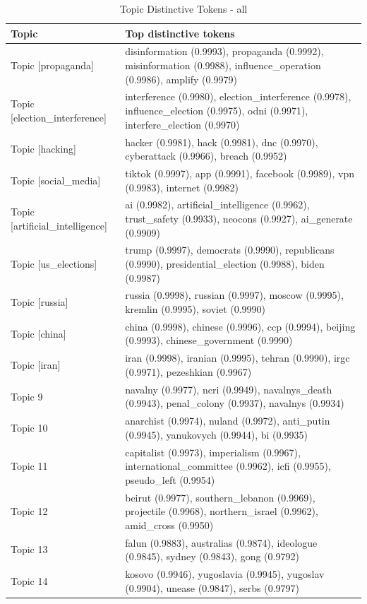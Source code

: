 \begin{table}
\centering
\small
\caption{Topic Distinctive Tokens - all}
\label{tab:topic_distinctive_tokens_all}
\begin{tabular}{lp{12cm}}
\toprule
Topic & Top distinctive tokens \\
\midrule
Topic [propaganda] & disinformation (0.9993), propaganda (0.9992), misinformation (0.9988), influence\_operation (0.9986), amplify (0.9979) \\
Topic [election\_interference] & interference (0.9980), election\_interference (0.9978), influence\_election (0.9975), odni (0.9971), interfere\_election (0.9970) \\
Topic [hacking] & hacker (0.9981), hack (0.9981), dnc (0.9970), cyberattack (0.9966), breach (0.9952) \\
Topic [social\_media] & tiktok (0.9997), app (0.9991), facebook (0.9989), vpn (0.9983), internet (0.9982) \\
Topic [artificial\_intelligence] & ai (0.9982), artificial\_intelligence (0.9962), trust\_safety (0.9933), neocons (0.9927), ai\_generate (0.9909) \\
Topic [us\_elections] & trump (0.9997), democrats (0.9990), republicans (0.9990), presidential\_election (0.9988), biden (0.9987) \\
Topic [russia] & russia (0.9998), russian (0.9997), moscow (0.9995), kremlin (0.9995), soviet (0.9990) \\
Topic [china] & china (0.9998), chinese (0.9996), ccp (0.9994), beijing (0.9993), chinese\_government (0.9990) \\
Topic [iran] & iran (0.9998), iranian (0.9995), tehran (0.9990), irgc (0.9971), pezeshkian (0.9967) \\
Topic 9 & navalny (0.9977), ncri (0.9949), navalnys\_death (0.9943), penal\_colony (0.9937), navalnys (0.9934) \\
Topic 10 & anarchist (0.9974), nuland (0.9972), anti\_putin (0.9945), yanukovych (0.9944), bi (0.9935) \\
Topic 11 & capitalist (0.9973), imperialism (0.9967), international\_committee (0.9962), icfi (0.9955), pseudo\_left (0.9954) \\
Topic 12 & beirut (0.9977), southern\_lebanon (0.9969), projectile (0.9968), northern\_israel (0.9962), amid\_cross (0.9950) \\
Topic 13 & falun (0.9883), australias (0.9874), ideologue (0.9845), sydney (0.9843), gong (0.9792) \\
Topic 14 & kosovo (0.9946), yugoslavia (0.9945), yugoslav (0.9904), unease (0.9847), serbs (0.9797) \\

\end{tabular}
\end{table}
